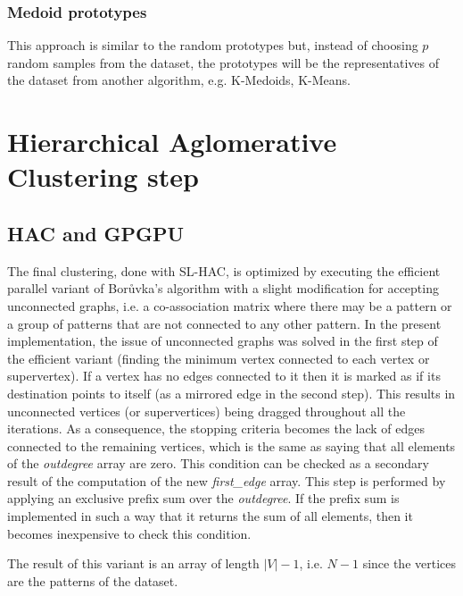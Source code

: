 \subsubsection{Medoid prototypes}
This approach is similar to the random prototypes but, instead of choosing $p$ random samples from the dataset, the prototypes will be the representatives of the dataset from another algorithm, e.g. K-Medoids, K-Means.

\section{Hierarchical Aglomerative Clustering step}

\subsection{HAC and GPGPU}
The final clustering, done with SL-HAC, is optimized by executing the efficient parallel variant of Borůvka's algorithm \cite{Sousa2015} with a slight modification for accepting unconnected graphs, i.e. a co-association matrix where there may be a pattern or a group of patterns that are not connected to any other pattern.
In the present implementation, the issue of unconnected graphs was solved in the first step of the efficient variant (finding the minimum vertex connected to each vertex or supervertex). If a vertex has no edges connected to it then it is marked as if its destination points to itself (as a mirrored edge in the second step). This results in unconnected vertices (or supervertices) being dragged throughout all the iterations.
As a consequence, the stopping criteria becomes the lack of edges connected to the remaining vertices, which is the same as saying that all elements of the \emph{outdegree} array are zero. This condition can be checked as a secondary result of the computation of the new \emph{first\_edge} array. This step is performed by applying an exclusive prefix sum over the \emph{outdegree}. If the prefix sum is implemented in such a way that it returns the sum of all elements, then it becomes inexpensive to check this condition.

The result of this variant is an array of length $|V|-1$, i.e. $N-1$ since the vertices are the patterns of the dataset. 



